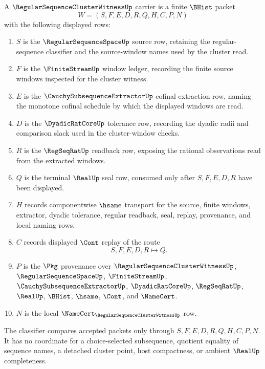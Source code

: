 \begin{definition}
\label{def:regular-sequence-cluster-witness-carrier}
A $\RegularSequenceClusterWitnessUp$ carrier is a finite $\BHist$ packet
$$
W=(S,F,E,D,R,Q,H,C,P,N)
$$
with the following displayed rows:
\begin{enumerate}
\item $S$ is the $\RegularSequenceSpaceUp$ source row, retaining the regular-sequence classifier and the source-window names used by the cluster read.
\item $F$ is the $\FiniteStreamUp$ window ledger, recording the finite source windows inspected for the cluster witness.
\item $E$ is the $\CauchySubsequenceExtractorUp$ cofinal extraction row, naming the monotone cofinal schedule by which the displayed windows are read.
\item $D$ is the $\DyadicRatCoreUp$ tolerance row, recording the dyadic radii and comparison slack used in the cluster-window checks.
\item $R$ is the $\RegSeqRatUp$ readback row, exposing the rational observations read from the extracted windows.
\item $Q$ is the terminal $\RealUp$ seal row, consumed only after $S,F,E,D,R$ have been displayed.
\item $H$ records componentwise $\hsame$ transport for the source, finite windows, extractor, dyadic tolerance, regular readback, seal, replay, provenance, and local naming rows.
\item $C$ records displayed $\Cont$ replay of the route
$$
S,F,E,D,R\longmapsto Q .
$$
\item $P$ is the $\Pkg$ provenance over $\RegularSequenceClusterWitnessUp$, $\RegularSequenceSpaceUp$, $\FiniteStreamUp$, $\CauchySubsequenceExtractorUp$, $\DyadicRatCoreUp$, $\RegSeqRatUp$, $\RealUp$, $\BHist$, $\hsame$, $\Cont$, and $\NameCert$.
\item $N$ is the local $\NameCert_{\RegularSequenceClusterWitnessUp}$ row.
\end{enumerate}
The classifier compares accepted packets only through $S,F,E,D,R,Q,H,C,P,N$. It has no coordinate for a choice-selected subsequence, quotient equality of sequence names, a detached cluster point, host compactness, or ambient $\RealUp$ completeness.
\end{definition}

